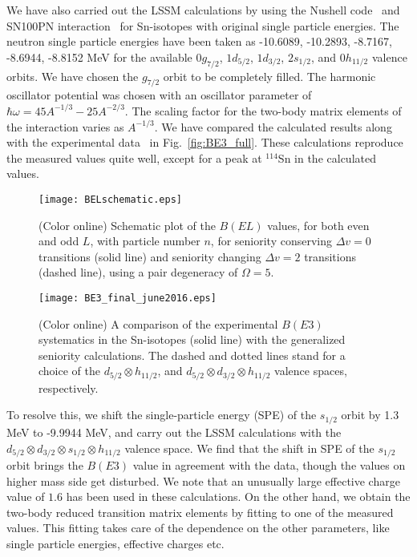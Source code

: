\documentclass[twocolumn,showpacs,showkeys,preprintnumbers,amsmath,amssymb]{revtex4}
\begin{document}
We have also carried out the LSSM calculations by using the Nushell code~\cite{brown} and SN100PN interaction~\cite{brown1} for Sn-isotopes with original single particle energies. The neutron single particle energies have been taken as -10.6089, -10.2893, -8.7167, -8.6944, -8.8152 MeV for the available $0g_{7/2}$, $1d_{5/2}$, $1d_{3/2}$, $2s_{1/2}$, and $0h_{11/2}$ valence orbits. We have chosen the $g_{7/2}$ orbit to be completely filled. The harmonic oscillator potential was chosen with an oscillator parameter of $\hbar \omega =45A^{-1/3}-25A^{-2/3}$. The scaling factor for the two-body matrix elements of the interaction varies as $A^{-1/3}$. We have compared the calculated results along with the experimental data~\cite{ensdf} in Fig.~\ref{fig:BE3_full}. These calculations reproduce the measured values quite well, except for a peak at $^{114}$Sn in the calculated values. 

\begin{figure}
\texttt{[image: BELschematic.eps]} 
\caption{\label{fig:bel}(Color online) Schematic plot of the $B(EL)$ values, for both even and odd $L$, with particle number $n$, for seniority conserving $\Delta v=0$ transitions (solid line) and seniority changing $\Delta v=2$ transitions (dashed line), using a pair degeneracy of $\Omega=5$.} 
\end{figure}

\begin{figure}
\texttt{[image: BE3\_final\_june2016.eps]}
\caption{\label{fig:be3}(Color online) A comparison of the experimental $B(E3)$ systematics in the Sn-isotopes (solid line) with the generalized seniority calculations. The dashed and dotted lines stand for a choice of the $d_{5/2} \otimes h_{11/2}$, and $d_{5/2} \otimes d_{3/2} \otimes h_{11/2}$ valence spaces, respectively.} 
\end{figure}

To resolve this, we shift the single-particle energy (SPE) of the $s_{1/2}$ orbit by 1.3 MeV to -9.9944 MeV, and carry out the LSSM calculations with the $d_{5/2} \otimes d_{3/2} \otimes s_{1/2} \otimes h_{11/2}$ valence space. We find that the shift in SPE of the $s_{1/2}$ orbit brings the $B(E3)$ value in agreement with the data, though the values on higher mass side get disturbed. We note that an unusually large effective charge value of $1.6$ has been used in these calculations. On the other hand, we obtain the two-body reduced transition matrix elements by fitting to one of the measured values. This fitting takes care of the dependence on the other parameters, like single particle energies, effective charges etc.
\end{document}
